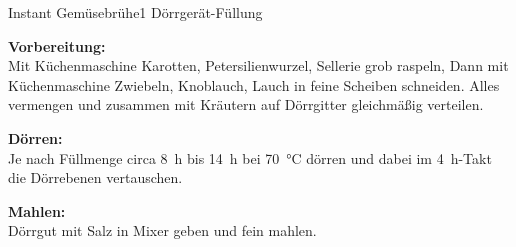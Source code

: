 \begin{MyRecipe}{Instant Gemüsebrühe}{1 Dörrgerät-Füllung}{}
	
	
	
	\textbf{Vorbereitung:}\\
	Mit Küchenmaschine Karotten, Petersilienwurzel, Sellerie grob raspeln, Dann mit Küchenmaschine Zwiebeln, Knoblauch, Lauch in feine Scheiben schneiden. Alles vermengen und zusammen mit Kräutern auf Dörrgitter gleichmäßig verteilen.\par\bigskip
	
	\textbf{Dörren:}\\
	Je nach Füllmenge circa \SI{8}{\hour} bis \SI{14}{\hour} bei \SI{70}{\degreeCelsius} dörren und dabei im \SI{4}{\hour}-Takt die Dörrebenen vertauschen.\par\bigskip
	
	\textbf{Mahlen:}\\
	Dörrgut mit Salz in Mixer geben und fein mahlen.
		
\end{MyRecipe}